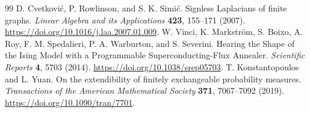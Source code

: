 \documentclass[11pt,a4paper]{article}
\begin{document}
\begin{thebibliography}{99}
D. Cvetkovi\'c, P. Rowlinson, and S. K. Simi\'c.
Signless Laplacians of finite graphs.
\emph{Linear Algebra and its Applications} \textbf{423}, 155--171 (2007).
\url{https://doi.org/10.1016/j.laa.2007.01.009}.
W. Vinci, K. Markstr\"om, S. Boixo, A. Roy, F. M. Spedalieri,
P. A. Warburton, and S. Severini.
Hearing the Shape of the Ising Model with a Programmable
Superconducting-Flux Annealer.
\emph{Scientific Reports} \textbf{4}, 5703 (2014).
\url{https://doi.org/10.1038/srep05703}.
T. Konstantopoulos and L. Yuan.
On the extendibility of finitely exchangeable probability measures.
\emph{Transactions of the American Mathematical Society}
\textbf{371}, 7067--7092 (2019).
\url{https://doi.org/10.1090/tran/7701}.
\end{thebibliography}
\end{document}
